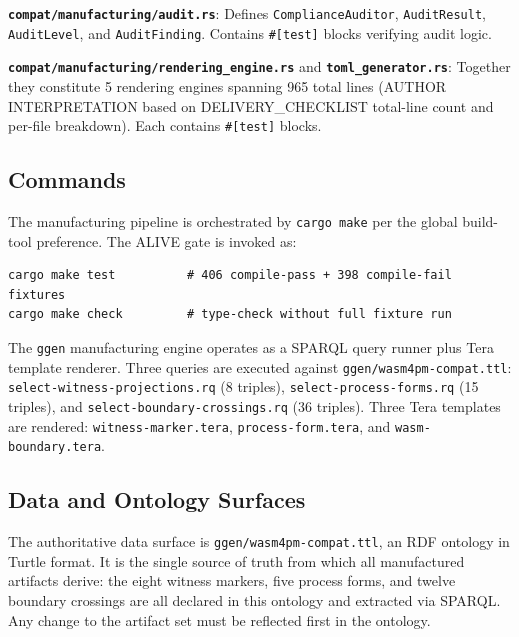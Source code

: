 \textbf{\texttt{compat/manufacturing/audit.rs}}: Defines \texttt{ComplianceAuditor},
\texttt{AuditResult}, \texttt{AuditLevel}, and \texttt{AuditFinding}. Contains
\texttt{\#[test]} blocks verifying audit logic.

\textbf{\texttt{compat/manufacturing/rendering\_engine.rs}} and
\textbf{\texttt{toml\_generator.rs}}: Together they constitute 5 rendering engines
spanning 965 total lines (AUTHOR INTERPRETATION based on DELIVERY\_CHECKLIST
total-line count and per-file breakdown). Each contains \texttt{\#[test]} blocks.

\subsection{Commands}
\label{sec:sources-wasm4pm-compat-implementation-commands}

The manufacturing pipeline is orchestrated by \texttt{cargo make} per the global
build-tool preference. The ALIVE gate is invoked as:

\begin{verbatim}
cargo make test          # 406 compile-pass + 398 compile-fail fixtures
cargo make check         # type-check without full fixture run
\end{verbatim}

The \texttt{ggen} manufacturing engine operates as a SPARQL query runner plus Tera
template renderer. Three queries are executed against
\texttt{ggen/wasm4pm-compat.ttl}: \texttt{select-witness-projections.rq} (8 triples),
\texttt{select-process-forms.rq} (15 triples), and
\texttt{select-boundary-crossings.rq} (36 triples). Three Tera templates are rendered:
\texttt{witness-marker.tera}, \texttt{process-form.tera}, and \texttt{wasm-boundary.tera}.

\subsection{Data and Ontology Surfaces}
\label{sec:sources-wasm4pm-compat-implementation-data}

The authoritative data surface is \texttt{ggen/wasm4pm-compat.ttl}, an RDF ontology
in Turtle format. It is the single source of truth from which all manufactured artifacts
derive: the eight witness markers, five process forms, and twelve boundary crossings are
all declared in this ontology and extracted via SPARQL. Any change to the artifact set
must be reflected first in the ontology.

